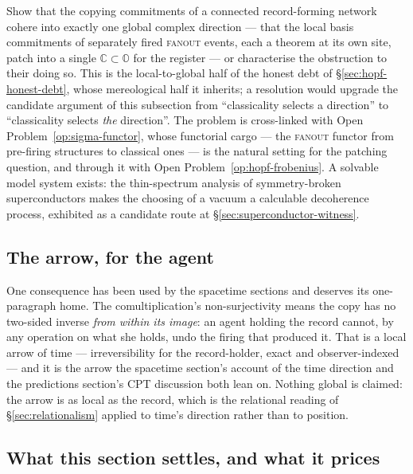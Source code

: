 \begin{openproblem}\label{op:fanout-selection}
Show that the copying commitments of a connected record-forming network cohere into exactly one
global complex direction --- that the local basis commitments of separately fired \textsc{fanout}
events, each a theorem at its own site, patch into a single
$\mathbb{C} \subset \mathbb{O}$ for the register --- or characterise the obstruction to their
doing so. This is the local-to-global half of the honest debt of \S\ref{sec:hopf-honest-debt},
whose mereological half it inherits; a resolution would upgrade the candidate argument of this
subsection from ``classicality selects a direction'' to ``classicality selects \emph{the}
direction''. The problem is cross-linked with Open Problem~\ref{op:sigma-functor}, whose functorial
cargo --- the \textsc{fanout} functor from pre-firing structures to classical ones --- is the
natural setting for the patching question, and through it with
Open Problem~\ref{op:hopf-frobenius}.
 A solvable model system exists: the thin-spectrum analysis of symmetry-broken
superconductors makes the choosing of a vacuum a calculable decoherence process, exhibited as a
candidate route at \S\ref{sec:superconductor-witness}.
\end{openproblem}

\subsection{The arrow, for the agent}

One consequence has been used by the spacetime sections and deserves its one-paragraph home. The
comultiplication's non-surjectivity means the copy has no two-sided inverse \emph{from within its
image}: an agent holding the record cannot, by any operation on what she holds, undo the firing
that produced it. That is a local arrow of time --- irreversibility for the record-holder, exact
and observer-indexed --- and it is the arrow the spacetime section's account of the time direction
and the predictions section's CPT discussion both lean on. Nothing global is claimed: the arrow is
as local as the record, which is the relational reading of \S\ref{sec:relationalism} applied to
time's direction rather than to position.

\subsection{What this section settles, and what it prices}

